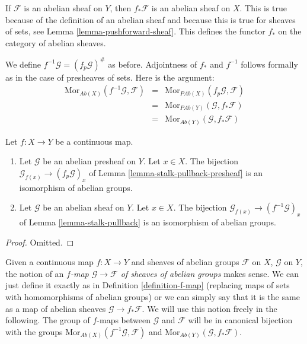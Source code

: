 \medskip\noindent
If $\mathcal{F}$ is an abelian sheaf on $Y$, then $f_*\mathcal{F}$
is an abelian sheaf on $X$. This is true because of the definition
of an abelian sheaf and because this is true for sheaves of sets,
see Lemma \ref{lemma-pushforward-sheaf}. This defines the functor
$f_*$ on the category of abelian sheaves.

\medskip\noindent
We define $f^{-1}\mathcal{G} = (f_p\mathcal{G})^\#$ as before.
Adjointness of $f_*$ and $f^{-1}$ follows formally as in
the case of presheaves of sets. Here is the argument:
\begin{eqnarray*}
\text{Mor}_{\textit{Ab}(X)}(f^{-1}\mathcal{G}, \mathcal{F})
& = &
\text{Mor}_{\textit{PAb}(X)}(f_p\mathcal{G}, \mathcal{F}) \\
& = &
\text{Mor}_{\textit{PAb}(Y)}(\mathcal{G}, f_*\mathcal{F}) \\
& = &
\text{Mor}_{\textit{Ab}(Y)}(\mathcal{G}, f_*\mathcal{F})
\end{eqnarray*}

\begin{lemma}
\label{lemma-pullback-abelian-stalk}
Let $f : X \to Y$ be a continuous map.
\begin{enumerate}
\item Let $\mathcal{G}$ be an abelian presheaf on $Y$.
Let $x \in X$. The bijection
$\mathcal{G}_{f(x)} \to (f_p\mathcal{G})_x$ of
Lemma \ref{lemma-stalk-pullback-presheaf} is an isomorphism of abelian groups.
\item Let $\mathcal{G}$ be an abelian sheaf on $Y$.
Let $x \in X$. The bijection
$\mathcal{G}_{f(x)} \to (f^{-1}\mathcal{G})_x$ of
Lemma \ref{lemma-stalk-pullback} is an isomorphism of abelian groups.
\end{enumerate}
\end{lemma}

\begin{proof}
Omitted.
\end{proof}

\noindent
Given a continuous map $f : X \to Y$ and sheaves of abelian
groups $\mathcal{F}$ on $X$, $\mathcal{G}$ on $Y$, the notion
of an {\it $f$-map $\mathcal{G} \to \mathcal{F}$
of sheaves of abelian groups} makes sense. We can just define
it exactly as in Definition \ref{definition-f-map} (replacing maps
of sets with homomorphisms of abelian groups) or we can
simply say that it is the same as a map of abelian
sheaves $\mathcal{G} \to f_*\mathcal{F}$. We will use this
notion freely in the following. The group of $f$-maps between
$\mathcal{G}$ and $\mathcal{F}$ will be in canonical bijection
with the groups
$\text{Mor}_{\textit{Ab}(X)}(f^{-1}\mathcal{G}, \mathcal{F})$
and 
$\text{Mor}_{\textit{Ab}(Y)}(\mathcal{G}, f_*\mathcal{F})$.

